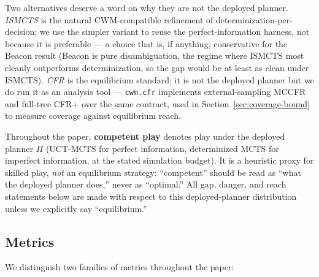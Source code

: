 \documentclass[11pt]{article}
\theoremstyle{remark}
\begin{document}
Two alternatives deserve a word on why they are not the deployed planner. \emph{ISMCTS} \citep{cowling2012ismcts} is the natural CWM-compatible refinement of determinization-per-decision; we use the simpler variant to reuse the perfect-information harness, not because it is preferable --- a choice that is, if anything, conservative for the Beacon result (Beacon is pure disambiguation, the regime where ISMCTS most cleanly outperforms determinization, so the gap would be at least as clean under ISMCTS). \emph{CFR} \citep{zinkevich2007cfr} is the equilibrium standard; it is not the deployed planner but we do run it as an analysis tool --- \texttt{cwm.cfr} implements external-sampling MCCFR \citep{lanctot2009mccfr} and full-tree CFR+ \citep{tammelin2014cfrplus} over the same contract, used in Section~\ref{sec:coverage-bound} to measure coverage against equilibrium reach.

Throughout the paper, \textbf{competent play} denotes play under the deployed planner $\Pi$ (UCT-MCTS for perfect information, determinized MCTS for imperfect information, at the stated simulation budget). It is a heuristic proxy for skilled play, \emph{not} an equilibrium strategy: ``competent'' should be read as ``what the deployed planner does,'' never as ``optimal.'' All gap, danger, and reach statements below are made with respect to this deployed-planner distribution unless we explicitly say ``equilibrium.''

\subsection{Metrics}

We distinguish two families of metrics throughout the paper:
\end{document}

